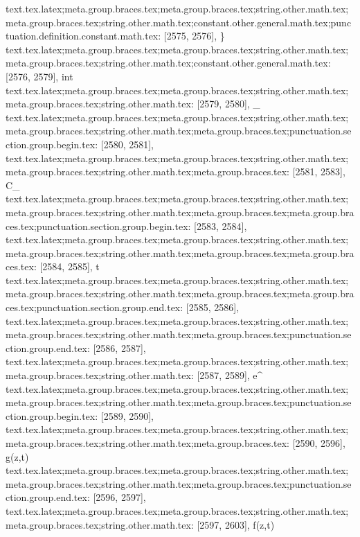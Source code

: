 {{{{{{{{{{{{{{{{{{{{{{{{{{{{{{{{{{{{{{{{{{{{{{{{{{{{{{{{{{{{{{{{{{{{{{{{{{{{{{{{{{{{{{{{text.tex.latex;meta.group.braces.tex;meta.group.braces.tex;string.other.math.tex;meta.group.braces.tex;string.other.math.tex;constant.other.general.math.tex;punctuation.definition.constant.math.tex: [2575, 2576], {\}
text.tex.latex;meta.group.braces.tex;meta.group.braces.tex;string.other.math.tex;meta.group.braces.tex;string.other.math.tex;constant.other.general.math.tex: [2576, 2579], {int}
text.tex.latex;meta.group.braces.tex;meta.group.braces.tex;string.other.math.tex;meta.group.braces.tex;string.other.math.tex: [2579, 2580], {_}
text.tex.latex;meta.group.braces.tex;meta.group.braces.tex;string.other.math.tex;meta.group.braces.tex;string.other.math.tex;meta.group.braces.tex;punctuation.section.group.begin.tex: [2580, 2581], {{}
text.tex.latex;meta.group.braces.tex;meta.group.braces.tex;string.other.math.tex;meta.group.braces.tex;string.other.math.tex;meta.group.braces.tex: [2581, 2583], {C_}
text.tex.latex;meta.group.braces.tex;meta.group.braces.tex;string.other.math.tex;meta.group.braces.tex;string.other.math.tex;meta.group.braces.tex;meta.group.braces.tex;punctuation.section.group.begin.tex: [2583, 2584], {{}
text.tex.latex;meta.group.braces.tex;meta.group.braces.tex;string.other.math.tex;meta.group.braces.tex;string.other.math.tex;meta.group.braces.tex;meta.group.braces.tex: [2584, 2585], {t}
text.tex.latex;meta.group.braces.tex;meta.group.braces.tex;string.other.math.tex;meta.group.braces.tex;string.other.math.tex;meta.group.braces.tex;meta.group.braces.tex;punctuation.section.group.end.tex: [2585, 2586], {}}
text.tex.latex;meta.group.braces.tex;meta.group.braces.tex;string.other.math.tex;meta.group.braces.tex;string.other.math.tex;meta.group.braces.tex;punctuation.section.group.end.tex: [2586, 2587], {}}
text.tex.latex;meta.group.braces.tex;meta.group.braces.tex;string.other.math.tex;meta.group.braces.tex;string.other.math.tex: [2587, 2589], {e^}
text.tex.latex;meta.group.braces.tex;meta.group.braces.tex;string.other.math.tex;meta.group.braces.tex;string.other.math.tex;meta.group.braces.tex;punctuation.section.group.begin.tex: [2589, 2590], {{}
text.tex.latex;meta.group.braces.tex;meta.group.braces.tex;string.other.math.tex;meta.group.braces.tex;string.other.math.tex;meta.group.braces.tex: [2590, 2596], {g(z,t)}
text.tex.latex;meta.group.braces.tex;meta.group.braces.tex;string.other.math.tex;meta.group.braces.tex;string.other.math.tex;meta.group.braces.tex;punctuation.section.group.end.tex: [2596, 2597], {}}
text.tex.latex;meta.group.braces.tex;meta.group.braces.tex;string.other.math.tex;meta.group.braces.tex;string.other.math.tex: [2597, 2603], {f(z,t)}
}}}}}}}}}}}}}}}}}}}}}}}}}}}}}}}}}}}}}}}}}}}}}}}}}}}}}}}}}}}}}}}}}}}}}}}}}}}}}}}}}}}}}}}}}
